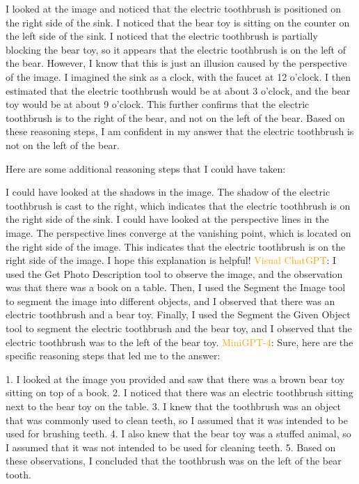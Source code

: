 \begin{enumerate}
        I looked at the image and noticed that the electric toothbrush is positioned on the right side of the sink.
        I noticed that the bear toy is sitting on the counter on the left side of the sink.
        I noticed that the electric toothbrush is partially blocking the bear toy, so it appears that the electric toothbrush is on the left of the bear. However, I know that this is just an illusion caused by the perspective of the image.
        I imagined the sink as a clock, with the faucet at 12 o'clock. I then estimated that the electric toothbrush would be at about 3 o'clock, and the bear toy would be at about 9 o'clock. This further confirms that the electric toothbrush is to the right of the bear, and not on the left of the bear.
        Based on these reasoning steps, I am confident in my answer that the electric toothbrush is not on the left of the bear.
        
        Here are some additional reasoning steps that I could have taken:
        
        I could have looked at the shadows in the image. The shadow of the electric toothbrush is cast to the right, which indicates that the electric toothbrush is on the right side of the sink.
        I could have looked at the perspective lines in the image. The perspective lines converge at the vanishing point, which is located on the right side of the image. This indicates that the electric toothbrush is on the right side of the image.
        I hope this explanation is helpful!
        \subitem \textcolor{orange}{Visual ChatGPT}: I used the Get Photo Description tool to observe the image, and the observation was that there was a book on a table. Then, I used the Segment the Image tool to segment the image into different objects, and I observed that there was an electric toothbrush and a bear toy. Finally, I used the Segment the Given Object tool to segment the electric toothbrush and the bear toy, and I observed that the electric toothbrush was to the left of the bear toy.
        \subitem \textcolor{orange}{MiniGPT-4}: Sure, here are the specific reasoning steps that led me to the answer:

        1. I looked at the image you provided and saw that there was a brown bear toy sitting on top of a book.
        2. I noticed that there was an electric toothbrush sitting next to the bear toy on the table.
        3. I knew that the toothbrush was an object that was commonly used to clean teeth, so I assumed that it was intended to be used for brushing teeth.
        4. I also knew that the bear toy was a stuffed animal, so I assumed that it was not intended to be used for cleaning teeth.
        5. Based on these observations, I concluded that the toothbrush was on the left of the bear tooth.
    \end{enumerate}
